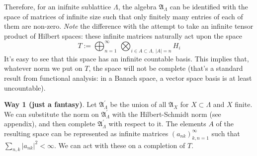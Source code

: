 Therefore, for an inifnite sublattice $\Lambda$, the algebra $\mathfrak A_{\Lambda}$ can be identified with the space of matrices of infinite size such that only finitely many entries of each of them are non-zero. \emph{Note} the difference with the attempt to take an infinite tensor product of Hilbert spaces: these infinite matrices naturally act upon the space 
\[
T:=\bigoplus_{n=1}^\infty \, \bigotimes_{i \in A \subset \Lambda, \ |A| = n} H_i 
\]
It's easy to see that this space has an infinite countable basis. This implies that, whatever norm we put on $T$, the space will not be complete (that's a standard result from functional analysis: in a Banach space, a vector space basis is at least uncountable).

\textbf{Way 1 (just a fantasy)}. Let $\mathfrak A_{\Lambda}^\prime$ be the union of all $\mathfrak A_X$ for $X \subset \Lambda$ and $X$ finite. We can substitute the norm on $\mathfrak A_{\Lambda}^\prime$ with the Hilbert-Schmidt norm (see appendix), and then complete $\mathfrak A_{\Lambda}^\prime$ with respect to it. The elements $A$ of the resulting space can be represented as infinite matrices $(a_{nk})_{k,n = 1}^{\infty}$ such that $\sum_{n,k} |a_{nk}|^2 < \infty$. We can act with these on a completion of $T$.


%
%
